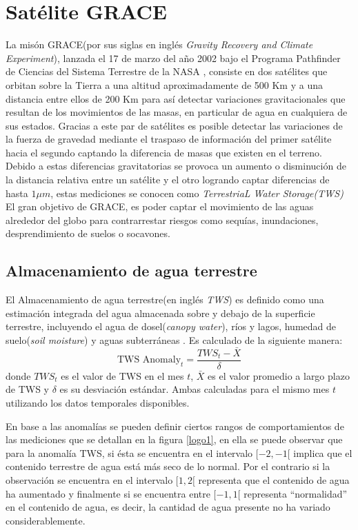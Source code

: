 \section{Satélite GRACE}
La misón GRACE(por sus siglas en inglés \textit{Gravity Recovery and Climate Experiment}), lanzada el 17 de marzo del año 2002
bajo el Programa Pathfinder de Ciencias del Sistema Terrestre de la NASA \cite{11}, consiste en dos satélites 
que orbitan sobre la Tierra a una altitud aproximadamente de 500 Km y a una distancia entre ellos de 200 Km\cite{tws} para así detectar variaciones gravitacionales que resultan
de los movimientos de las masas, en particular de agua en cualquiera de sus estados.
Gracias a este par de satélites es posible detectar las variaciones de la fuerza de gravedad 
mediante el traspaso de información del primer satélite hacia el segundo captando la diferencia de 
masas que existen en el terreno. Debido a estas diferencias gravitatorias se provoca un aumento o 
disminución de la distancia relativa entre un satélite y el otro logrando captar diferencias de hasta 
$1\mu m$, estas mediciones se conocen como \textit{TerrestriaL Water Storage(TWS)}
El gran objetivo de GRACE, es poder captar el movimiento de las aguas alrededor del globo para 
contrarrestar riesgos como sequías, inundaciones, desprendimiento de suelos o socavones.

\subsection{Almacenamiento de agua terrestre}
El Almacenamiento de agua terrestre(en inglés \textit{TWS}) es definido como una estimación integrada del agua almacenada sobre y debajo de la superficie terrestre, 
incluyendo el agua de dosel(\textit{canopy water}), ríos y lagos, humedad de suelo(\textit{soil moisture}) y aguas subterráneas \cite{tws}. Es calculado de la siguiente manera:
\begin{equation}
    \text{TWS Anomaly}_t = \frac{TWS_t-\bar{X}}{\delta}
\end{equation}
donde $TWS_t$ es el valor de TWS en el mes $t$, $\bar{X}$ es el valor promedio a largo plazo de TWS y $\delta$ es su desviación estándar. Ambas calculadas para el mismo mes $t$ utilizando 
los datos temporales disponibles\cite{tws}.

En base a las anomalías se pueden definir ciertos rangos de comportamientos de las mediciones que se detallan en la figura \ref{logo1}, en ella se puede observar que para la anomalía TWS, si ésta se encuentra en el intervalo $[-2,-1[$
implica que  el contenido terrestre de agua está más seco de lo normal. Por el contrario si la observación se encuentra en el intervalo $[1,2[$ representa que el contenido de agua ha aumentado y finalmente si se encuentra entre
$[-1,1[$ representa ``normalidad'' en el contenido de agua, es decir, la cantidad de agua presente no ha variado considerablemente.

